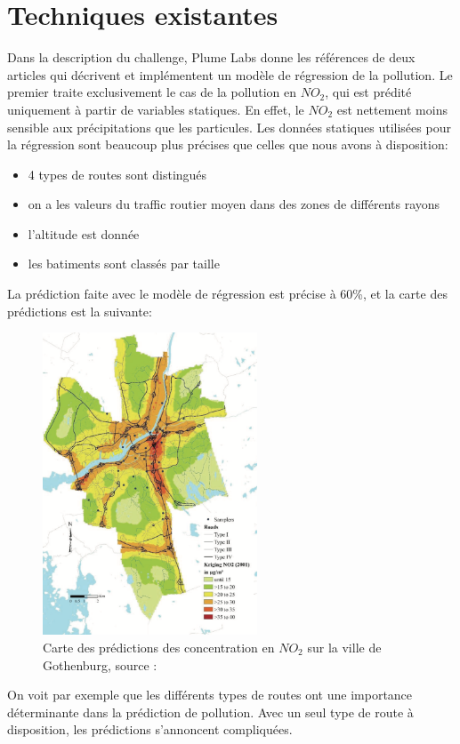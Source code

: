 \section{Techniques existantes}

Dans la description du challenge, Plume Labs donne les références de deux articles qui décrivent et implémentent un modèle de régression de la pollution.
Le premier \cite{NO2reg} traite exclusivement le cas de la pollution en $NO_2$, qui est prédité uniquement à partir de variables statiques.
En effet, le $NO_2$ est nettement moins sensible aux précipitations que les particules.
Les données statiques utilisées pour la régression sont beaucoup plus précises que celles que nous avons à disposition:
\begin{itemize}
  \item 4 types de routes sont distingués
  \item on a les valeurs du traffic routier moyen dans des zones de différents rayons
  \item l'altitude est donnée
  \item les batiments sont classés par taille
\end{itemize}

La prédiction faite avec le modèle de régression est précise à 60\%, et la carte des prédictions est la suivante:

\begin{figure}
  \includegraphics[height=9cm]{images/pollution_gothenburg.png}
  \caption{Carte des prédictions des concentration en $NO_2$ sur la ville de Gothenburg, source : \cite{NO2reg}}
\end{figure}

On voit par exemple que les différents types de routes ont une importance déterminante dans la prédiction de pollution.
Avec un seul type de route à disposition, les prédictions s'annoncent compliquées.

